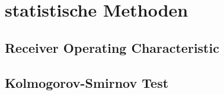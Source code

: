 \section{statistische Methoden}
\label{ch:Theorie:sec:statistischeMethoden}


\subsection{Receiver Operating Characteristic}
\label{ch:Algorithmen:subsec:ROC}


\subsection{Kolmogorov-Smirnov Test}
\label{ch:Algorithmen:subsec:KSTest}
